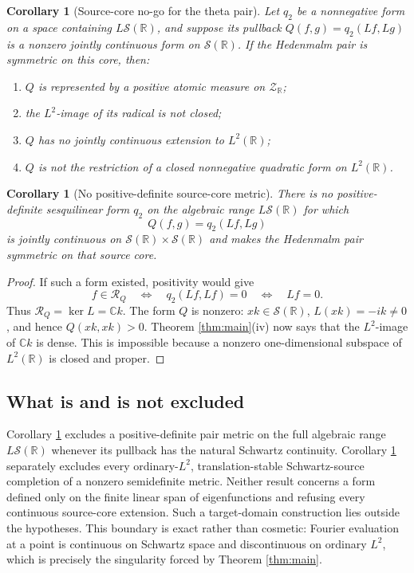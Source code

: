 \documentclass[11pt]{article}
\newtheorem{corollary}[theorem]{Corollary}
\newcommand{\C}{\mathbb C}
\newcommand{\R}{\mathbb R}
\newcommand{\cS}{\mathcal S}
\newcommand{\cR}{\mathcal R}
\newcommand{\cZ}{\mathcal Z}
\begin{document}
\begin{corollary}[Source-core no-go for the theta pair]\label{cor:no-go}
Let \(q_2\) be a nonnegative form on a space containing \(L\cS(\R)\), and suppose its pullback
\(Q(f,g)=q_2(Lf,Lg)\) is a nonzero jointly continuous form on \(\cS(\R)\).  If the Hedenmalm pair
is symmetric on this core, then:
\begin{enumerate}[label=\textup{(\alph*)}]
\item \(Q\) is represented by a positive atomic measure on \(\cZ_{\R}\);
\item the \(L^2\)-image of its radical is not closed;
\item \(Q\) has no jointly continuous extension to \(L^2(\R)\);
\item \(Q\) is not the restriction of a closed nonnegative quadratic form on \(L^2(\R)\).
\end{enumerate}
\end{corollary}

\begin{corollary}[No positive-definite source-core metric]\label{cor:no-hilbert}
There is no positive-definite sesquilinear form \(q_2\) on the algebraic range
\(L\cS(\R)\) for which
\[
 Q(f,g)=q_2(Lf,Lg)
 \tag{1.17}
\]
is jointly continuous on \(\cS(\R)\times\cS(\R)\) and makes the Hedenmalm pair symmetric on
that source core.
\end{corollary}

\begin{proof}
If such a form existed, positivity would give
\[
 f\in\cR_Q
 \quad\Longleftrightarrow\quad
 q_2(Lf,Lf)=0
 \quad\Longleftrightarrow\quad
 Lf=0.
\]
Thus \(\cR_Q=\ker L=\C k\).  The form \(Q\) is nonzero: \(xk\in\cS(\R)\),
\(L(xk)=-ik\ne0\), and hence \(Q(xk,xk)>0\).  Theorem \ref{thm:main}\textup{(iv)} now says that
the \(L^2\)-image of \(\C k\) is dense.  This is impossible because a nonzero one-dimensional
subspace of \(L^2(\R)\) is closed and proper.
\end{proof}

\subsection{What is and is not excluded}

Corollary \ref{cor:no-hilbert} excludes a positive-definite pair metric on the full algebraic
range \(L\cS(\R)\) whenever its pullback has the natural Schwartz continuity.  Corollary
\ref{cor:no-go} separately excludes every ordinary-\(L^2\), translation-stable
Schwartz-source completion of a nonzero semidefinite metric.  Neither result concerns a form defined only on the
finite linear span of eigenfunctions and refusing every continuous source-core extension.  Such
a target-domain construction lies outside the hypotheses.  This boundary is exact rather than
cosmetic: Fourier evaluation at a point is continuous on Schwartz space and discontinuous on
ordinary \(L^2\), which is precisely the singularity forced by Theorem \ref{thm:main}.
\end{document}
